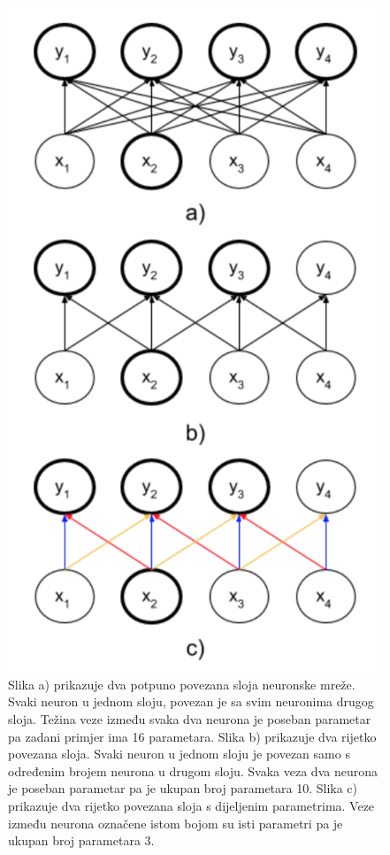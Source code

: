  \begin{figure}
	\centering
	\includegraphics[scale=0.8]{img/povezanost.png}
	\caption{Slika a) prikazuje dva potpuno povezana sloja neuronske mreže. Svaki neuron u jednom sloju, povezan je sa svim neuronima drugog sloja. Težina veze između svaka dva neurona je poseban parametar pa zadani primjer ima 16 parametara. Slika b) prikazuje dva rijetko povezana sloja. Svaki neuron u jednom sloju je povezan samo s određenim brojem neurona u drugom sloju. Svaka veza dva neurona je poseban parametar pa je ukupan broj parametara 10. Slika c) prikazuje dva rijetko povezana sloja s dijeljenim parametrima. Veze između neurona označene istom bojom su isti parametri pa je ukupan broj parametara 3.}
	\label{povezanost}
\end{figure}

